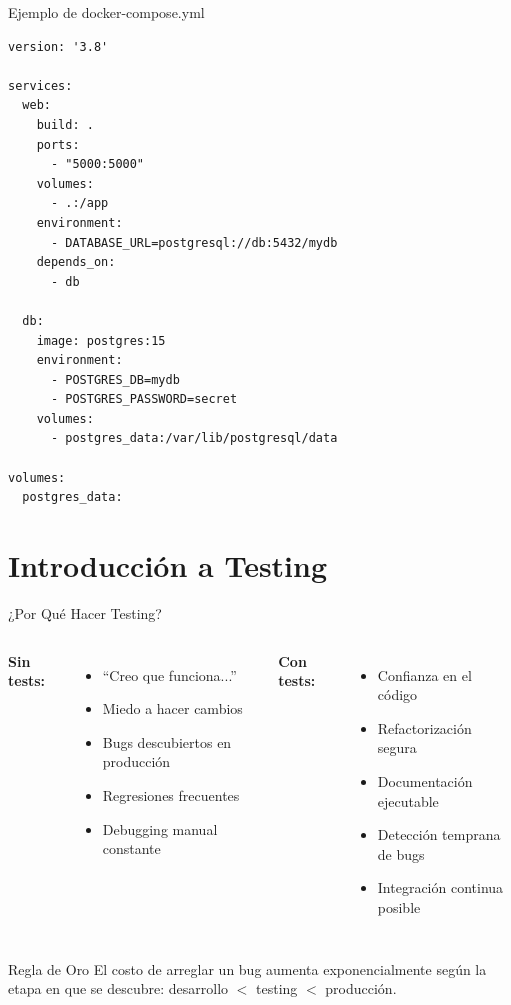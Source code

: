 \documentclass[aspectratio=169]{beamer}
\begin{document}
\begin{frame}[fragile]{Ejemplo de docker-compose.yml}
\begin{lstlisting}[title=docker-compose.yml]
version: '3.8'

services:
  web:
    build: .
    ports:
      - "5000:5000"
    volumes:
      - .:/app
    environment:
      - DATABASE_URL=postgresql://db:5432/mydb
    depends_on:
      - db

  db:
    image: postgres:15
    environment:
      - POSTGRES_DB=mydb
      - POSTGRES_PASSWORD=secret
    volumes:
      - postgres_data:/var/lib/postgresql/data

volumes:
  postgres_data:
\end{lstlisting}
\end{frame}



\section{Introducción a Testing}

\begin{frame}{¿Por Qué Hacer Testing?}
    \begin{columns}
        \textbf{Sin tests:}
        \begin{itemize}
            \item ``Creo que funciona...''
            \item Miedo a hacer cambios
            \item Bugs descubiertos en producción
            \item Regresiones frecuentes
            \item Debugging manual constante
        \end{itemize}
        
        \textbf{Con tests:}
        \begin{itemize}
            \item Confianza en el código
            \item Refactorización segura
            \item Documentación ejecutable
            \item Detección temprana de bugs
            \item Integración continua posible
        \end{itemize}
    \end{columns}
    
    \vspace{0.5cm}
    \begin{block}{Regla de Oro}
        El costo de arreglar un bug aumenta exponencialmente según la etapa en que se descubre: desarrollo $<$ testing $<$ producción.
    \end{block}
\end{frame}
\end{document}
